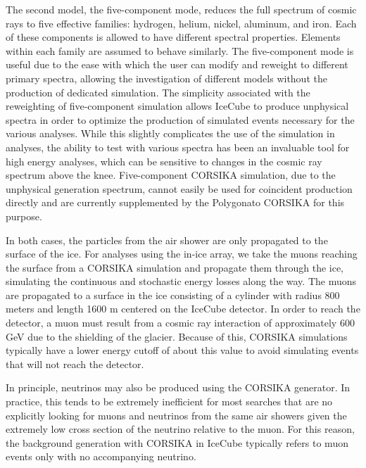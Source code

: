 The second model, the five-component mode, reduces the full spectrum of cosmic rays to five effective families: hydrogen, helium, nickel, aluminum, and iron. 
Each of these components is allowed to have different spectral properties.
Elements within each family are assumed to behave similarly.
The five-component mode is useful due to the ease with which the user can modify and reweight to different primary spectra, allowing the investigation of different models without the production of dedicated simulation.
The simplicity associated with the reweighting of five-component simulation allows IceCube to produce unphysical spectra in order to optimize the production of simulated events necessary for the various analyses.
While this slightly complicates the use of the simulation in analyses, the ability to test with various spectra has been an invaluable tool for high energy analyses, which can be sensitive to changes in the cosmic ray spectrum above the knee.
Five-component CORSIKA simulation, due to the unphysical generation spectrum, cannot easily be used for coincident production directly and are currently supplemented by the Polygonato CORSIKA for this purpose.

In both cases, the particles from the air shower are only propagated to the surface of the ice. 
For analyses using the in-ice array, we take the muons reaching the surface from a CORSIKA simulation and propagate them through the ice, simulating the continuous and stochastic energy losses along the way. 
The muons are propagated to a surface in the ice consisting of a cylinder with radius 800 meters and length 1600 m centered on the IceCube detector.
In order to reach the detector, a muon must result from a cosmic ray interaction of approximately 600 GeV due to the shielding of the glacier.
Because of this, CORSIKA simulations typically have a lower energy cutoff of about this value to avoid simulating events that will not reach the detector.

In principle, neutrinos may also be produced using the CORSIKA generator. 
In practice, this tends to be extremely inefficient for most searches that are no explicitly looking for muons and neutrinos from the same air showers given the extremely low cross section of the neutrino relative to the muon.
For this reason, the background generation with CORSIKA in IceCube typically refers to muon events only with no accompanying neutrino.

\label{subsubsec:muongun}
